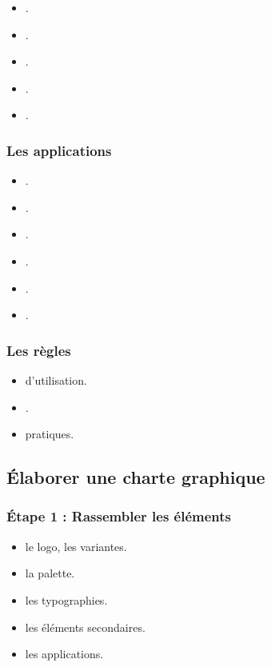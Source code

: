 \begin{itemize}
    \item {}.
    \item {}.
    \item {}.
    \item {}.
    \item {}.
\end{itemize}

\subsubsection{Les applications}

\begin{itemize}
    \item {}.
    \item {}.
    \item {}.
    \item {}.
    \item {}.
    \item {}.
\end{itemize}

\subsubsection{Les règles}

\begin{itemize}
    \item {} d'utilisation.
    \item {}.
    \item {} pratiques.
\end{itemize}

\subsection{Élaborer une charte graphique}

\subsubsection{Étape 1 : Rassembler les éléments}

\begin{itemize}
    \item {} le logo, les variantes.
    \item {} la palette.
    \item {} les typographies.
    \item {} les éléments secondaires.
    \item {} les applications.
\end{itemize}

